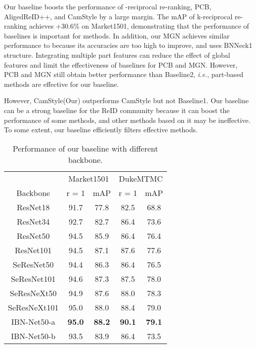 \documentclass[journal]{IEEEtran}
\begin{document}
Our baseline boosts the performance of -reciprocal re-ranking, PCB, AligedReID++, and CamStyle by a large margin. The mAP of k-reciprocal re-ranking achieves +30.6\% on Market1501, demonstrating that the performance of baselines is important for methods. In addition, our MGN achieves similar performance to \cite{wang2018learning} because its accuracies are too high to improve, and \cite{wang2018learning} uses BNNeck1 structure. 
Integrating multiple part features can reduce the effect of global features and limit the effectiveness of baselines for PCB and MGN. 
However, PCB and MGN still obtain better performance than Baseline2, \emph{i.e.}, part-based methods are effective for our baseline. 

However, CamStyle(Our) outperforms CamStyle \cite{zhong2019camstyle} but not Baseline1. 
Our baseline can be a strong baseline for the ReID community because it can boost the performance of some methods, and other methods based on it may be ineffective.
To some extent, our baseline efficiently filters effective methods.

\begin{table}[tb]\footnotesize
  \begin{center}
  \begin{tabular}{ c|cc|cc}
\hline
  	 				& \multicolumn{2}{c|}{Market1501} & \multicolumn{2}{c}{DukeMTMC}	 \\
  Backbone			& r = 1 	& mAP	&r = 1 	& mAP 	 \\
 	\hline
	\hline
ResNet18     &91.7	&77.8	&82.5	&68.8			\\
ResNet34	   &92.7 &82.7 &  86.4 &73.6 			\\
ResNet50     &94.5 &85.9 & 86.4 &76.4    		\\
ResNet101     &94.5 &87.1 &  87.6 &77.6			\\
SeResNet50    &94.4 &86.3 & 86.4 &76.5			\\
SeResNet101    &94.6 &87.3 & 87.5 &78.0			\\
SeResNeXt50    &94.9 &87.6 & 88.0 &78.3			\\
SeResNeXt101    & 95.0 &88.0 & 88.4 &79.0			\\
IBN-Net50-a    &\textbf{95.0}	&\textbf{88.2}	&\textbf{90.1}	&\textbf{79.1}			\\
IBN-Net50-b    &93.5	&83.9	&86.4	&73.5			\\
\hline
  \end{tabular}
  \end{center}
  \caption{\label{tab:backbone}Performance of our baseline with different backbone.}
\vspace{-2mm}
\end{table}
\end{document}
